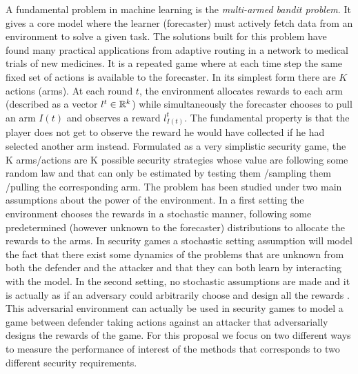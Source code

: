 A fundamental problem in machine learning is the \textit{multi-armed bandit problem}. It  gives a core model where the learner (forecaster) must actively fetch data from an environment to solve a given task. The solutions built for this problem have found many practical applications from adaptive routing in a network to medical trials of new medicines\cite{bubeck2012regret}.  It is a repeated game where at each time step the same fixed set of actions is available to the forecaster.  In its simplest form there are $K$ actions (arms). At each round $t$, the environment allocates rewards to each arm (described as a vector $l^t\in\mathbb{R}^k$) while simultaneously the forecaster chooses to pull an arm $I(t)$ and observes a reward $l^t_{I(t)}$.  The fundamental property is that the player does not get to observe the reward he would have collected if he had selected another arm instead. Formulated as a very simplistic security game, the K arms/actions are K possible security strategies whose value are following some random law and that can  only be estimated by testing  them /sampling them /pulling the corresponding arm. 
The problem has been studied under two main assumptions about the power of the environment. In a first setting  the environment chooses the rewards in a stochastic manner, following some predetermined (however unknown to the forecaster) distributions to allocate the rewards to the arms. In security games a stochastic setting assumption will model the fact that there exist some  dynamics of the problems that are unknown from both the defender and the attacker and that they can both learn by interacting with the model. In the second setting, no stochastic assumptions are made and it is actually as if an adversary could arbitrarily choose and design all the rewards
\cite{Auer03NS}. This adversarial environment can actually be used in security games to model a game between defender taking actions against an attacker that adversarially designs the rewards of the game.
For this proposal we focus on two different ways to measure the performance of interest of the methods that corresponds to two different security requirements. %

